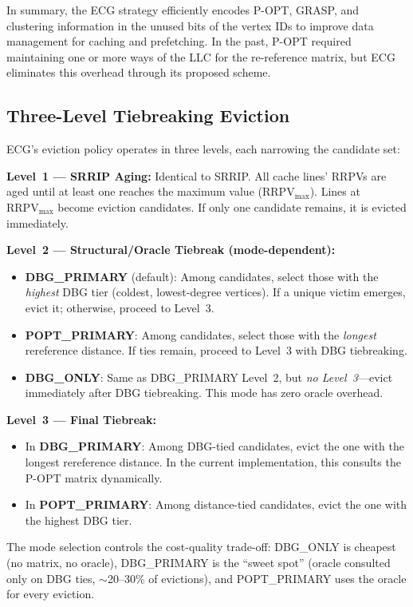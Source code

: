 \documentclass[conference]{IEEEtran}
\begin{document}
In summary, the ECG strategy efficiently encodes P-OPT, GRASP, and clustering information in the unused bits of the vertex IDs to improve data management for caching and prefetching. In the past, P-OPT required maintaining one or more ways of the LLC for the re-reference matrix, but ECG eliminates this overhead through its proposed scheme.

\subsection{Three-Level Tiebreaking Eviction}
\label{ECG:Tiebreaking}

ECG's eviction policy operates in three levels, each narrowing the candidate set:

\textbf{Level~1 --- SRRIP Aging:} Identical to SRRIP. All cache lines' RRPVs are aged until at least one reaches the maximum value ($\text{RRPV}_{\max}$). Lines at $\text{RRPV}_{\max}$ become eviction candidates. If only one candidate remains, it is evicted immediately.

\textbf{Level~2 --- Structural/Oracle Tiebreak (mode-dependent):}
\begin{itemize}[topsep=2pt,itemsep=0pt,wide]
    \item \textbf{DBG\_PRIMARY} (default): Among candidates, select those with the \emph{highest} DBG tier (coldest, lowest-degree vertices). If a unique victim emerges, evict it; otherwise, proceed to Level~3.
    \item \textbf{POPT\_PRIMARY}: Among candidates, select those with the \emph{longest} rereference distance. If ties remain, proceed to Level~3 with DBG tiebreaking.
    \item \textbf{DBG\_ONLY}: Same as DBG\_PRIMARY Level~2, but \emph{no Level~3}---evict immediately after DBG tiebreaking. This mode has zero oracle overhead.
\end{itemize}

\textbf{Level~3 --- Final Tiebreak:}
\begin{itemize}[topsep=2pt,itemsep=0pt,wide]
    \item In \textbf{DBG\_PRIMARY}: Among DBG-tied candidates, evict the one with the longest rereference distance. In the current implementation, this consults the P-OPT matrix dynamically.
    \item In \textbf{POPT\_PRIMARY}: Among distance-tied candidates, evict the one with the highest DBG tier.
\end{itemize}

The mode selection controls the cost-quality trade-off: DBG\_ONLY is cheapest (no matrix, no oracle), DBG\_PRIMARY is the ``sweet spot'' (oracle consulted only on DBG ties, $\sim$20--30\% of evictions), and POPT\_PRIMARY uses the oracle for every eviction.
\end{document}

